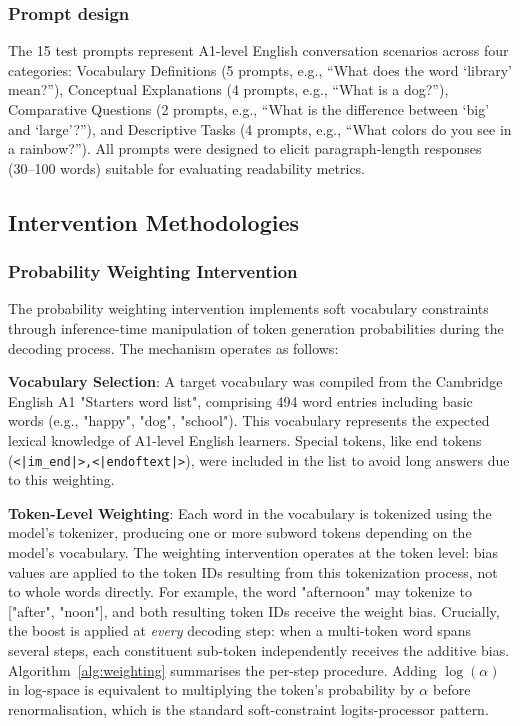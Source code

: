 \documentclass[10pt, a4paper]{article}
\let\oldtexttt\texttt
\renewcommand{\texttt}[1]{{\small\oldtexttt{#1}}}
\begin{document}
\subsubsection{Prompt design}
The 15 test prompts represent A1-level English conversation scenarios across four categories: Vocabulary Definitions (5 prompts, e.g., ``What does the word `library' mean?''), Conceptual Explanations (4 prompts, e.g., ``What is a dog?''), Comparative Questions (2 prompts, e.g., ``What is the difference between `big' and `large'?''), and Descriptive Tasks (4 prompts, e.g., ``What colors do you see in a rainbow?''). All prompts were designed to elicit paragraph-length responses (30--100 words) suitable for evaluating readability metrics.

\subsection{Intervention Methodologies}
\subsubsection{Probability Weighting Intervention}
The probability weighting intervention implements soft vocabulary constraints through inference-time manipulation of token generation probabilities during the decoding process. The mechanism operates as follows:

\textbf{Vocabulary Selection}: A target vocabulary was compiled from the Cambridge English A1 "Starters word list", comprising 494 word entries including basic words (e.g., "happy", "dog", "school"). This vocabulary represents the expected lexical knowledge of A1-level English learners. Special tokens, like end tokens (\texttt{<|im\_end|>,<|endoftext|>}), were included in the list to avoid long answers due to this weighting.

\textbf{Token-Level Weighting}: Each word in the vocabulary is tokenized using the model's tokenizer, producing one or more subword tokens depending on the model's vocabulary. The weighting intervention operates at the token level: bias values are applied to the token IDs resulting from this tokenization process, not to whole words directly. For example, the word "afternoon" may tokenize to ["after", "noon"], and both resulting token IDs receive the weight bias. Crucially, the boost is applied at \emph{every} decoding step: when a multi-token word spans several steps, each constituent sub-token independently receives the additive bias. Algorithm~\ref{alg:weighting} summarises the per-step procedure. Adding $\log(\alpha)$ in log-space is equivalent to multiplying the token's probability by $\alpha$ before renormalisation, which is the standard soft-constraint logits-processor pattern.
\end{document}
